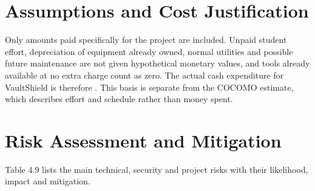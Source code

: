 \documentclass[12pt,a4paper,oneside]{report}
\begin{document}
\section{Assumptions and Cost Justification}\label{assumptions-and-cost-justification}

Only amounts paid specifically for the project are included. Unpaid student effort, depreciation of equipment already owned, normal utilities and possible future maintenance are not given hypothetical monetary values, and tools already available at no extra charge count as zero. The actual cash expenditure for VaultShield is therefore . This basis is separate from the COCOMO estimate, which describes effort and schedule rather than money spent.

\section{Risk Assessment and Mitigation}\label{risk-assessment-and-mitigation}

Table 4.9 lists the main technical, security and project risks with their likelihood, impact and mitigation.

\begingroup\small
\end{document}
